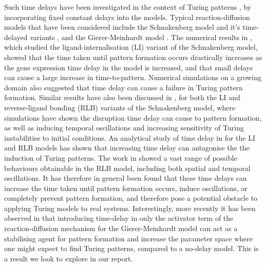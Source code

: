 Such time delays have been investigated in the context of Turing patterns \cite{gaffmonk,leegaffney,yigaffneyli,jiang,leegaffmonk,bratsun,william}, by incorporating fixed constant delays into the models. Typical reaction-diffusion models that have been considered include the Schnakenberg model and it's time-delayed variants \cite{schnakenberg}, and the Gierer-Meinhardt model \cite{gm}. The numerical results in \cite{gaffmonk}, which studied the ligand-internalisation (LI) variant of the Schnakenberg model, showed that the time taken until pattern formation occurs drastically increases as the gene expression time delay in the model is increased, and that small delays can cause a large increase in time-to-pattern. Numerical simulations on a growing domain also suggested that time delay can cause a failure in Turing pattern formation. Similar results have also been discussed in \cite{leegaffney,leegaffmonk}, for both the LI and reverse-ligand bonding (RLB) variants of the Schnakenberg model, where simulations have shown the disruption time delay can cause to pattern formation, as well as inducing temporal oscillations and increasing sensitivity of Turing instabilities to initial conditions. An analytical study of time delay in \cite{yigaffneyli} for the LI and RLB models has shown that increasing time delay can antagonise the the induction of Turing patterns. The work in \cite{jiang} showed a vast range of possible behaviours obtainable in the RLB model, including both spatial and temporal oscillations. It has therefore in general been found that these time delays can increase the time taken until pattern formation occurs, induce oscillations, or completely prevent pattern formation, and therefore pose a potential obstacle to applying Turing models to real systems. Interestingly, more recently it has been observed in \cite{fadai} that introducing time-delay in only the activator term of the reaction-diffusion mechanism for the Gierer-Meinhardt model can act as a stabilising agent for pattern formation and increase the parameter space where one might expect to find Turing patterns, compared to a no-delay model. This is a result we look to explore in our report.
\\\\
